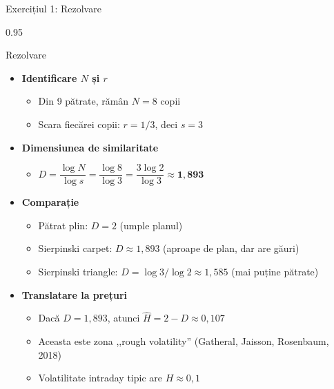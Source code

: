 \documentclass[9pt, aspectratio=169, t]{beamer}
\begin{document}
\begin{frame}[shrink=15]{Exercițiul 1: Rezolvare}
\begin{cminipage}{0.95\textwidth}
\begin{exampleblock}{Rezolvare}
\begin{itemize}\setlength{\itemsep}{0pt}
    \item \textbf{Identificare $N$ și $r$}
    \begin{itemize}\setlength{\itemsep}{0pt}
        \item Din 9 pătrate, rămân $N=8$ copii
        \item Scara fiecărei copii: $r=1/3$, deci $s=3$
    \end{itemize}
    \item \textbf{Dimensiunea de similaritate}
    \begin{itemize}\setlength{\itemsep}{0pt}
        \item $D=\dfrac{\log N}{\log s}=\dfrac{\log 8}{\log 3}=\dfrac{3\log 2}{\log 3}\approx \mathbf{1{,}893}$
    \end{itemize}
    \item \textbf{Comparație}
    \begin{itemize}\setlength{\itemsep}{0pt}
        \item Pătrat plin: $D=2$ (umple planul)
        \item Sierpinski carpet: $D\approx 1{,}893$ (aproape de plan, dar are găuri)
        \item Sierpinski triangle: $D=\log 3/\log 2\approx 1{,}585$ (mai puține pătrate)
    \end{itemize}
    \item \textbf{Translatare la prețuri}
    \begin{itemize}\setlength{\itemsep}{0pt}
        \item Dacă $D=1{,}893$, atunci $\hat H=2-D\approx 0{,}107$
        \item Aceasta este zona ,,rough volatility'' (Gatheral, Jaisson, Rosenbaum, 2018)
        \item Volatilitate intraday tipic are $H\approx 0{,}1$
    \end{itemize}
\end{itemize}
\end{exampleblock}
\end{cminipage}
\end{frame}
\end{document}
